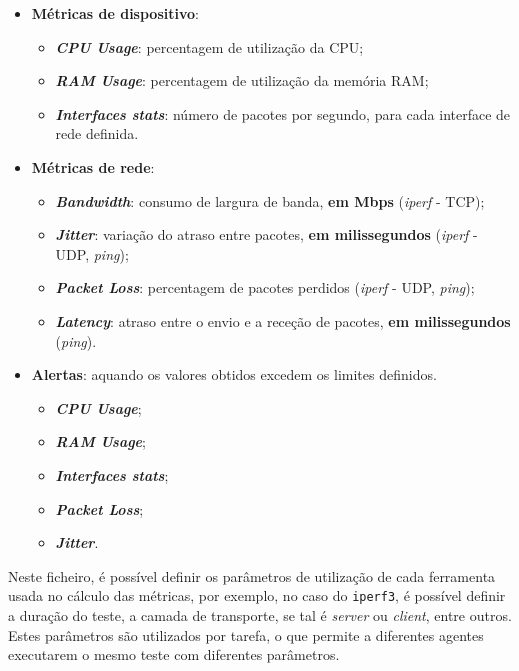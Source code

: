\documentclass[a4paper,12pt]{scrreprt}
\begin{document}
\begin{itemize}
    \item \textbf{Métricas de dispositivo}:
    \begin{itemize}
        \item \textbf{\textit{CPU Usage}}: percentagem de utilização da CPU;
        \item \textbf{\textit{RAM Usage}}: percentagem de utilização da memória RAM;
        \item \textbf{\textit{Interfaces stats}}: número de pacotes por segundo,
            para cada interface de rede definida.
    \end{itemize}
    \item \textbf{Métricas de rede}:
    \begin{itemize}
        \item \textbf{\textit{Bandwidth}}: consumo de largura de banda, \textbf{em Mbps} (\textit{iperf} - TCP); 
        \item \textbf{\textit{Jitter}}: variação do atraso entre pacotes, \textbf{em milissegundos}  (\textit{iperf} - UDP, \textit{ping});
        \item \textbf{\textit{Packet Loss}}: percentagem de pacotes perdidos (\textit{iperf} - UDP, \textit{ping}); 
        \item \textbf{\textit{Latency}}: atraso entre o envio e a receção de pacotes, \textbf{em milissegundos} (\textit{ping}). 
    \end{itemize}
    \item \textbf{Alertas}: aquando os valores obtidos excedem os limites definidos.
    \begin{itemize}
        \item \textbf{\textit{CPU Usage}};
        \item \textbf{\textit{RAM Usage}};
        \item \textbf{\textit{Interfaces stats}};
        \item \textbf{\textit{Packet Loss}};
        \item \textbf{\textit{Jitter}}.
    \end{itemize}
\end{itemize}

Neste ficheiro, é possível definir os parâmetros de utilização de cada ferramenta usada no cálculo das métricas,
por exemplo, no caso do \texttt{iperf3}, é possível definir a duração do teste, a camada de transporte, se tal é
\textit{server} ou \textit{client}, entre outros. Estes parâmetros são utilizados por tarefa, o que permite a
diferentes agentes executarem o mesmo teste com diferentes parâmetros.
\end{document}
